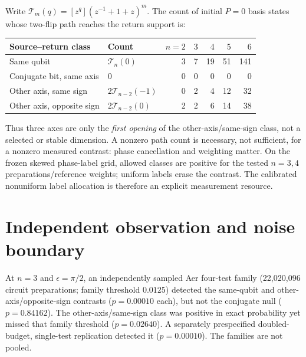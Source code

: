 \documentclass[11pt,a4paper]{article}
\newcommand{\T}{\mathcal T}
\begin{document}
Write $\T_m(q)=[z^q](z^{-1}+1+z)^m$. The count of initial $P=0$ basis states whose two-flip path reaches the return support is:
\begin{center}
\small
\begin{tabular}{@{}l l r r r r r@{}}
\toprule
Source--return class & Count & $n=2$ & $3$ & $4$ & $5$ & $6$\\
\midrule
Same qubit & $\T_n(0)$ & 3 & 7 & 19 & 51 & 141\\
Conjugate bit, same axis & $0$ & 0 & 0 & 0 & 0 & 0\\
Other axis, same sign & $2\T_{n-2}(-1)$ & 0 & 2 & 4 & 12 & 32\\
Other axis, opposite sign & $2\T_{n-2}(0)$ & 2 & 2 & 6 & 14 & 38\\
\bottomrule
\end{tabular}
\end{center}
Thus three axes are only the \emph{first opening} of the other-axis/same-sign class, not a selected or stable dimension. A nonzero path count is necessary, not sufficient, for a nonzero measured contrast: phase cancellation and weighting matter. On the frozen skewed phase-label grid, allowed classes are positive for the tested $n=3,4$ preparations/reference weights; uniform labels erase the contrast. The calibrated nonuniform label allocation is therefore an explicit measurement resource.

\section*{Independent observation and noise boundary}
At $n=3$ and $\epsilon=\pi/2$, an independently sampled Aer four-test family (22,020,096 circuit preparations; family threshold $0.0125$) detected the same-qubit and other-axis/opposite-sign contrasts ($p=0.00010$ each), but not the conjugate null ($p=0.84162$). The other-axis/same-sign class was positive in exact probability yet missed that family threshold ($p=0.02640$). A separately prespecified doubled-budget, single-test replication detected it ($p=0.00010$). The families are not pooled.
\end{document}
